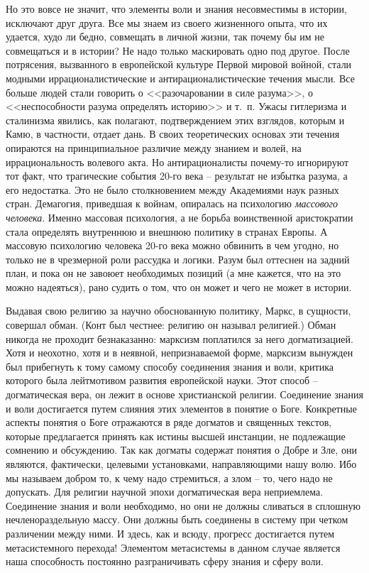 \documentclass{book}
\begin{document}
Но это вовсе не значит, что элементы воли и знания несовместимы в истории, исключают друг друга. Все мы знаем из своего жизненного опыта, что их удается, худо ли бедно, сов­мещать в личной жизни, так почему бы им не совмещаться и в истории? Не надо только маскировать одно под другое. После потрясения, вызванного в европейской культуре Первой мировой войной, стали модными иррационалистические и антирационалистические течения мысли. Все больше людей стали говорить о <<разочаровании в силе разума>>, о <<неспособности разума определять историю>> и т.~п. Ужасы гитлеризма и сталинизма явились, как полагают, подтверждением этих взглядов, которым и Камю, в частности, отдает дань. В своих теоретических основах эти течения опираются на принципиальное различие между знанием и волей, на иррациональность волевого акта. Но антирационалисты почему-то игнорируют тот факт, что тра­гические события 20-го века -- результат не избытка разума, а его недостатка. Это не было столкновением между Академиями наук разных стран. 
Демагогия, приведшая к войнам, опиралась на психологию \textit{массового человека}.  Именно массовая психология, а не борьба воинственной аристократии стала определять внутреннюю и внешнюю политику в странах Европы. А массовую психологию человека 20-го века можно обвинить в чем угодно, но только не в чрезмерной роли рассудка и логики. Разум был оттеснен на задний план, и пока он не завоюет необходимых позиций (а мне кажется, что на это можно надеяться), рано судить о том, что он может и чего не может в истории.

Выдавая свою религию за научно обоснованную политику, Маркс, в сущности, совершал обман. (Конт был честнее: религию он называл религией.) Обман никогда не проходит безнаказанно: марксизм поплатился за него догматизацией. Хотя и неохотно, хотя и в неявной, непризнаваемой форме, марксизм вынужден был прибегнуть к тому самому способу соединения знания и воли, критика которого была лейтмотивом развития европейской науки. Этот способ -- догматическая вера, он лежит в основе христианской религии. Соединение знания и воли достигается путем слияния этих элементов в понятие о Боге. Конкретные аспекты понятия о Боге отражаются в ряде догматов и священных текстов, которые предлагается принять как истины высшей инстанции, не подлежащие сомнению и обсуждению. Так как догматы содержат понятия о Добре и Зле, они являются, фактически, целевыми установками, направляющими нашу волю. Ибо мы называем добром то, к чему надо стре­миться, а злом -- то, чего надо не допускать.
Для религии научной эпохи догматическая вера неприемлема. Соединение знания и воли необходимо, но они не должны сливаться в сплошную нечленораздельную массу. Они должны быть соединены в систему при четком различении между ними. И здесь, как и всюду, прогресс достигается путем метасистемного перехода! Элементом метасистемы в данном случае является наша способность постоянно разграничивать сферу знания и сферу воли.
\end{document}
